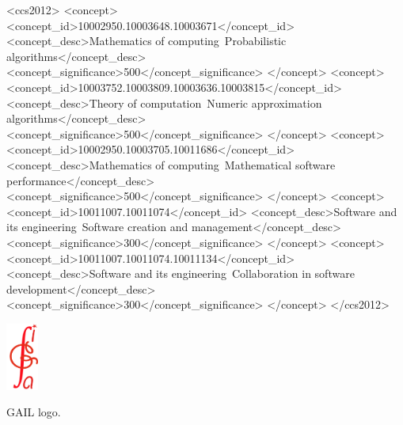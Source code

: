 \documentclass[sigconf]{acmart}
\begin{document}

\begin{CCSXML}
<ccs2012>
<concept>
<concept_id>10002950.10003648.10003671</concept_id>
<concept_desc>Mathematics of computing~Probabilistic algorithms</concept_desc>
<concept_significance>500</concept_significance>
</concept>
<concept>
<concept_id>10003752.10003809.10003636.10003815</concept_id>
<concept_desc>Theory of computation~Numeric approximation algorithms</concept_desc>
<concept_significance>500</concept_significance>
</concept>
<concept>
<concept_id>10002950.10003705.10011686</concept_id>
<concept_desc>Mathematics of computing~Mathematical software performance</concept_desc>
<concept_significance>500</concept_significance>
</concept>
<concept>
<concept_id>10011007.10011074</concept_id>
<concept_desc>Software and its engineering~Software creation and management</concept_desc>
<concept_significance>300</concept_significance>
</concept>
<concept>
<concept_id>10011007.10011074.10011134</concept_id>
<concept_desc>Software and its engineering~Collaboration in software development</concept_desc>
<concept_significance>300</concept_significance>
</concept>
</ccs2012>
\end{CCSXML}




\begin{teaserfigure}
\begin{center}
  \includegraphics[width=0.08\textwidth]{../logoGAIL2.png}
  \caption{GAIL logo.}
  \label{fig:teaser}
\end{center}
\end{teaserfigure}
\end{document}
